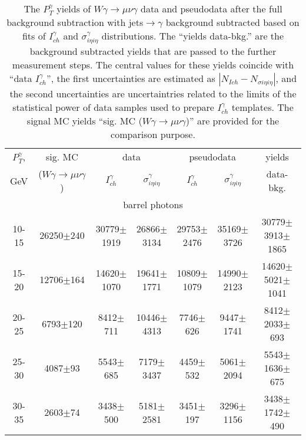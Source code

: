 \begin{table}[h]
  \tiny
  \begin{center}
  \caption{The $P_T^{\gamma}$ yields of $W\gamma\rightarrow\mu\nu\gamma$ data and pseudodata after the full background subtraction with jets$\rightarrow\gamma$ background subtracted based on fits of $I_{ch}^{\gamma}$ and  $\sigma_{i\eta i\eta}^\gamma$ distributions. The ``yields data-bkg.'' are the background subtracted yields that are passed to the further measurement steps. The central values for these yields coincide with ``data $I_{ch}^{\gamma}$'', the first uncertainties are estimated as $|N_{Ich}-N_{\sigma i\eta i\eta}|$, and the second uncertainties are uncertaintries related to the limits of the statistical power of data samples used to prepare $I_{ch}^{\gamma}$ templates. The signal MC yields ``sig. MC ($W\gamma\rightarrow\mu\nu\gamma$)'' are provided for the comparison purpose.}
  \begin{tabular}{|c|c|c|c|c|c|c|}
    $P_T^{\gamma}$, &  sig. MC   & \multicolumn{2}{|c|}{data}  & \multicolumn{2}{|c|}{pseudodata} & yields\\ 
    GeV & ($W\gamma\rightarrow\mu\nu\gamma$) & $I_{ch}^{\gamma}$ & $\sigma_{i\eta i\eta}^\gamma$  & $I_{ch}^{\gamma}$  & $\sigma_{i\eta i\eta}^\gamma$   & data-bkg. \\ \hline
    \multicolumn{7}{|c|}{barrel photons} \\ \hline
    10-15 & 26250$\pm$240 & 30779$\pm$1919 & 26866$\pm$3134 & 29753$\pm$2476 & 35169$\pm$3726 &30779$\pm$3913$\pm$1865  \\ \hline
    15-20 & 12706$\pm$164 & 14620$\pm$1070 & 19641$\pm$1771 & 10809$\pm$1079 & 14990$\pm$2123 &14620$\pm$5021$\pm$1041  \\ \hline
    20-25 & 6793$\pm$120 & 8412$\pm$711 & 10446$\pm$4313 & 7746$\pm$626 & 9447$\pm$1741 &8412$\pm$2033$\pm$693  \\ \hline
    25-30 & 4087$\pm$93 & 5543$\pm$685 & 7179$\pm$3437 & 4459$\pm$532 & 5061$\pm$2094 &5543$\pm$1636$\pm$675  \\ \hline
    30-35 & 2603$\pm$74 & 3438$\pm$500 & 5181$\pm$2581 & 3451$\pm$197 & 3296$\pm$1156 &3438$\pm$1742$\pm$490  \\ \hline

\end{tabular}
\end{center}
\end{table}
